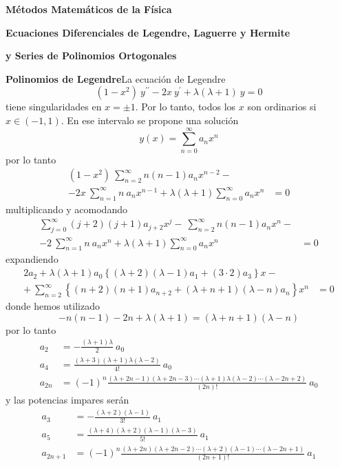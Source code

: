 \documentclass[spanish,notitlepage,letterpaper,12pt]{article}
\begin{document}
\begin{center}
\textbf{M\'{e}todos Matem\'{a}ticos de la F\'{i}sica}

\textbf{Ecuaciones Diferenciales de Legendre, Laguerre y Hermite}

\textbf{y Series de Polinomios Ortogonales }
\end{center}

\textbf{Polinomios de Legendre}\newline La ecuaci\'{o}n de Legendre
\[
(1-x^{2})\ y^{\prime\prime}-2x\ y^{\prime}+\lambda(\lambda+1)\ y=0
\]
tiene singularidades en $x=\pm1.$ Por lo tanto, todos los $x$ son ordinarios
si $x\in(-1,1).$ En ese intervalo se propone una soluci\'{o}n
\[
y(x)=\sum_{n=0}^{\infty}a_{n}x^{n}
\]
por lo tanto
\begin{align*}
(1-x^{2})\ \sum_{n=2}^{\infty}n(n-1)a_{n}x^{n-2}-  & \\
-2x\ \sum_{n=1}^{\infty}n\ a_{n}x^{n-1}+\lambda(\lambda+1)\sum_{n=0}^{\infty
}a_{n}x^{n}  & =0
\end{align*}
multiplicando y acomodando
\begin{align*}
\sum_{j=0}^{\infty}(j+2)(j+1)a_{j+2}x^{j}-\ \sum_{n=2}^{\infty}n(n-1)a_{n}%
x^{n}-  & \\
-2\ \sum_{n=1}^{\infty}n\ a_{n}x^{n}+\lambda(\lambda+1)\sum_{n=0}^{\infty
}a_{n}x^{n}  & =0
\end{align*}
expandiendo
\begin{align*}
2a_{2}+\lambda(\lambda+1)a_{0}\left\{  (\lambda+2)(\lambda-1)a_{1}%
+(3\cdot2)a_{3}\right\}  x-  & \\
+\ \sum_{n=2}^{\infty}\left\{  (n+2)(n+1)a_{n+2}+(\lambda+n+1)(\lambda
-n)a_{n}\right\}  x^{n}  & =0
\end{align*}
donde hemos utilizado
\[
-n(n-1)-2n+\lambda(\lambda+1)=(\lambda+n+1)(\lambda-n)
\]
por lo tanto
\begin{align*}
a_{2}  & =-\frac{(\lambda+1)\lambda}2\ a_{0}\\
a_{4}  & =\frac{(\lambda+3)(\lambda+1)\lambda(\lambda-2)}{4!}\ a_{0}\\
a_{2n}  & =(-1)^{n}\frac{(\lambda+2n-1)(\lambda+2n-3)\cdots(\lambda
+1)\lambda(\lambda-2)\cdots(\lambda-2n+2)}{(2n)!}\ a_{0}%
\end{align*}
y las potencias impares ser\'{a}n
\begin{align*}
a_{3}  & =-\frac{(\lambda+2)(\lambda-1)}{3!}\ a_{1}\\
a_{5}  & =\frac{(\lambda+4)(\lambda+2)(\lambda-1)(\lambda-3)}{5!}\ a_{1}\\
a_{2n+1}  & =(-1)^{n}\frac{(\lambda+2n)(\lambda+2n-2)\cdots(\lambda
+2)(\lambda-1)\cdots(\lambda-2n+1)}{(2n+1)!}\ a_{1}%
\end{align*}
\end{document}
